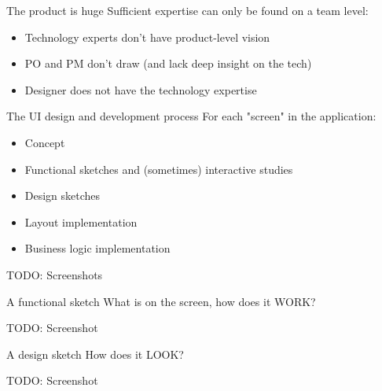 \documentclass[aspectratio=43,handout,bigger]{beamer}
\begin{document}
\begin{frame}{The product is huge}
  Sufficient expertise can only be found on a team level:

  \begin{itemize}
    \item Technology experts don't have product-level vision
    \item PO and PM don't draw (and lack deep insight on the tech)
    \item Designer does not have the technology expertise
  \end{itemize}
\end{frame}


\begin{frame}{The UI design and development process}
  For each "screen" in the application:

  \begin{itemize}
    \item Concept
    \item Functional sketches and (sometimes) interactive studies
    \item Design sketches
    \item Layout implementation
    \item Business logic implementation
  \end{itemize}

  TODO: Screenshots
\end{frame}


\begin{frame}{A functional sketch}
  What is on the screen, how does it WORK?

  TODO: Screenshot
\end{frame}


\begin{frame}{A design sketch}
  How does it LOOK?

  TODO: Screenshot
\end{frame}

\end{document}

